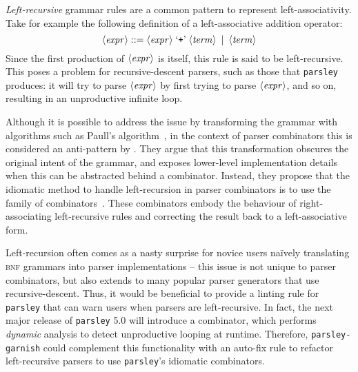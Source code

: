 \documentclass[../../main.tex]{subfiles}
\begin{document}
\label{sec:factor-leftrec}

\emph{Left-recursive} grammar rules are a common pattern to represent left-associativity.
Take for example the following definition of a left-associative addition operator:
\begin{equation*}
\langle \mathit{expr} \rangle ::= \langle \mathit{expr} \rangle \; \text{`\texttt{+}'} \; \langle \mathit{term} \rangle \enspace | \enspace \langle \mathit{term} \rangle
\end{equation*}
%
Since the first production of $\langle \mathit{expr} \rangle$ is itself, this rule is said to be left-recursive.
This poses a problem for recursive-descent parsers, such as those that \texttt{parsley} produces:
it will try to parse $\langle \mathit{expr} \rangle$ by first trying to parse $\langle \mathit{expr} \rangle$, and so on, resulting in an unproductive infinite loop.

Although it is possible to address the issue by transforming the grammar with algorithms such as Paull's algorithm~\cite{moore_removing_2000},
in the context of parser combinators this is considered an anti-pattern by \textcite{willis_design-haskell_2021}.
They argue that this transformation obscures the original intent of the grammar, and exposes lower-level implementation details when this can be abstracted behind a combinator.
Instead, they propose that the idiomatic method to handle left-recursion in parser combinators is to use the  family of combinators~\cite{fokker_functional_1995}.
These combinators embody the behaviour of right-associating left-recursive rules and correcting the result back to a left-associative form.

Left-recursion often comes as a nasty surprise for novice users naïvely translating \textsc{bnf} grammars into parser implementations -- this issue is not unique to parser combinators, but also extends to many popular parser generators that use recursive-descent.
Thus, it would be beneficial to provide a linting rule for \texttt{parsley} that can warn users when parsers are left-recursive.
In fact, the next major release of \texttt{parsley} 5.0 will introduce a  combinator, which performs \emph{dynamic} analysis to detect unproductive looping at runtime.
Therefore, \texttt{parsley-garnish} could complement this functionality with an auto-fix rule to refactor left-recursive parsers to use \texttt{parsley}'s idiomatic  combinators.
\end{document}
